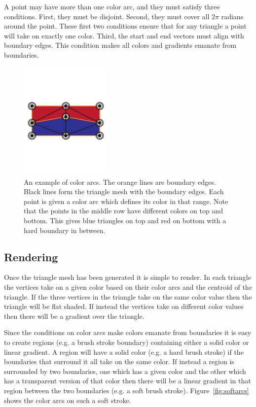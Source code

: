 \documentclass[review]{acmsiggraph}
\begin{document}
A point may have more than one color arc, and they must satisfy three conditions. First, they must be disjoint. Second,
they must cover all $2\pi$ radians around the point. These first two conditions ensure that for any
triangle a point will take on exactly one color. Third, the start and end vectors must align
with boundary edges. This condition makes all colors and gradients emanate from boundaries.

\begin{figure}
    \centering
        \includegraphics[width=0.4\textwidth]{images/colorarcs2}
    \caption{An example of color arcs. The orange lines are boundary edges. Black lines form the triangle
    mesh with the boundary edges. Each point is given a color arc which defines its color in that range.
    Note that the points in the middle row have different colors on top and bottom. This gives blue
    triangles on top and red on bottom with a hard boundary in between.}
    \label{fig:arcs}
\end{figure}

\subsection{Rendering}
Once the triangle mesh has been generated it is simple to render. In each triangle the vertices
take on a given color based on their color arcs and the centroid of the triangle. If the three
vertices in the triangle take on the same color value then the triangle will be flat shaded. If instead the 
vertices take on different color values then there will be a gradient over the triangle.

Since the conditions on color arcs make colors emanate from boundaries it is easy to create regions (e.g. a brush stroke boundary)
containing either a solid color or linear gradient. A region will have a solid color (e.g. a hard brush stroke) if the
boundaries that surround it all take on the same color. If instead a region is surrounded by
two boundaries, one which has a given color and the other which has a transparent version of that color
then there will be a linear gradient in that region between the two boundaries (e.g. a soft brush stroke).
Figure~\ref{fig:softarcs} shows the color arcs on such a soft stroke.
\end{document}
